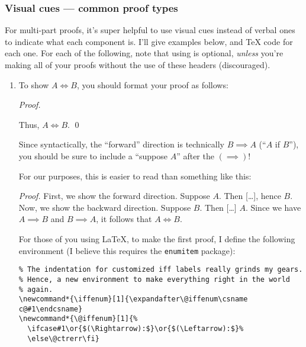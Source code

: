 \documentclass{fkpset}
\begin{document}
\subsubsection{Visual cues --- common proof types}
For multi-part proofs, it's super helpful to use visual cues instead of verbal
ones to indicate what each component is. I'll give examples below, and TeX code
for each one. For each of the following, note that using \cmark is optional,
\emph{unless} you're making all of your proofs without the use of these headers
(discouraged).
\begin{enumerate}[label=(\arabic*)]
\item To show $A \iff B$, you should format your proof as follows:
  \begin{leftbar}
    \emph{Proof.}
    Thus, $A \iff B$. \qed
  \end{leftbar}
  Since syntactically, the ``forward'' direction is technically $B \implies A$
  (``$A$ if $B$''), you should be sure to include a ``suppose $A$'' after the
  $(\implies)$!

  For our purposes, this is easier to read than something like this:
  \begin{leftbar}
    \emph{Proof.} First, we show the forward direction. Suppose $A$. Then
    [\ldots], hence $B$. Now, we show the backward direction. Suppose $B$.
    Then [\ldots] $A$. Since we have $A \implies B$ and $B \implies A$, it
    follows that $A \iff B$.
  \end{leftbar}
  For those of you using \LaTeX, to make the first proof, I define the
  following environment (I believe this requires the \texttt{enumitem}
  package):
  \begin{lstlisting}
% The indentation for customized iff labels really grinds my gears.
% Hence, a new environment to make everything right in the world
% again.
\newcommand*{\iffenum}[1]{\expandafter\@iffenum\csname c@#1\endcsname}
\newcommand*{\@iffenum}[1]{%
  \ifcase#1\or{$(\Rightarrow):$}\or{$(\Leftarrow):$}%
  \else\@ctrerr\fi}


\end{lstlisting}
\end{enumerate}
\end{document}
